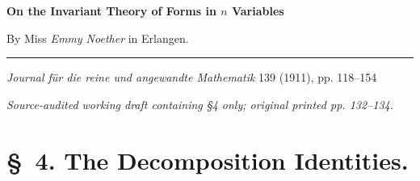 \documentclass[10pt]{article}
\begin{document}
\begin{center}
{\Large\bfseries On the Invariant Theory of Forms in $n$ Variables}\par
\vspace{0.5em}
By Miss \emph{Emmy Noether} in Erlangen.\par
\medskip
\rule{0.22\linewidth}{0.4pt}\par
\vspace{0.7em}
\emph{Journal f\"ur die reine und angewandte Mathematik} 139 (1911), pp. 118--154\par
\smallskip
{\small\itshape Source-audited working draft containing \S4 only; original printed pp. 132--134.}
\end{center}

\section*{\S\ 4. The Decomposition Identities.}
\end{document}
